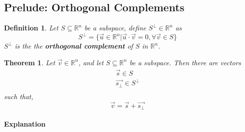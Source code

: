 \documentclass[11pt]{article}
\newtheorem{theorem}{Theorem}
\newtheorem{definition}{Definition}
\newcommand{\re}[1]{\mathbb{R}^#1}
\begin{document}
	\subsection{Prelude: Orthogonal Complements}
	\begin{definition}
		Let $S \subseteq \re{n}$ be a subspace, define $S^\perp \in \re{n}$ as
		\[
		S^\perp = \{\vec{u} \in \re{n} \vert \vec{u} \cdot \vec{v} = 0, \forall \vec{v} \in S\}
		\] $S^\perp$ is the the \textbf{orthogonal complement} of $S$ in $\re{n}$.
	\end{definition}
	\begin{theorem}
		Let $\vec{v} \in \re{n}$, and let $S \subseteq \re{n}$ be a subspace. \newline Then there are vectors
		\begin{align*}
			\vec{s} \in S \\
			\vec{s_{\perp}} \in S^\perp \\
		\end{align*}
		such that,
		\[
			\vec{v} = \vec{s} + \vec{s_{\perp}}
		\]
	\end{theorem}
	\paragraph{Explanation} 
\end{document}
